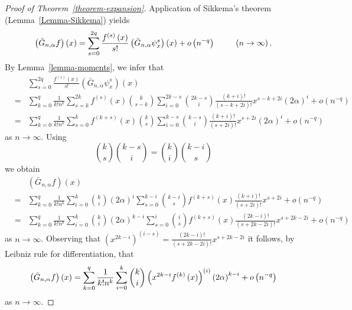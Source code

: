 \documentclass[10pt,a4paper]{amsart}
\begin{document}
\begin{proof}[Proof of Theorem~\protect\ref{theorem-expansion}]
Application of Sikkema's theorem (Lemma~\ref{Lemma-Sikkema}) yields 
\begin{equation*}
\left( \bar{G}_{n,\alpha }f\right) \left( x\right) =\sum_{s=0}^{2q}\frac{%
f^{\left( s\right) }\left( x\right) }{s!}\left( \bar{G}_{n,\alpha }\psi
_{x}^{s}\right) \left( x\right) +o\left( n^{-q}\right) \text{ }\qquad \left(
n\rightarrow \infty \right) .
\end{equation*}%
By Lemma~\ref{lemma-moments}, we infer that 
\begin{eqnarray*}
&&\sum_{s=0}^{2q}\frac{f^{\left( s\right) }\left( x\right) }{s!}\left( \bar{G%
}_{n,\alpha }\psi _{x}^{s}\right) \left( x\right)  \\
&=&\sum_{k=0}^{q}\frac{1}{k!n^{k}}\sum_{s=k}^{2k}f^{\left( s\right) }\left(
x\right) \binom{k}{s-k}\sum_{i=0}^{2k-s}\binom{2k-s}{i}\frac{\left(
k+i\right) !}{\left( s-k+2i\right) !}x^{s-k+2i}\left( 2\alpha \right)
^{i}+o\left( n^{-q}\right)  \\
&=&\sum_{k=0}^{q}\frac{1}{k!n^{k}}\sum_{s=0}^{k}f^{\left( k+s\right) }\left(
x\right) \binom{k}{s}\sum_{i=0}^{k-s}\binom{k-s}{i}\frac{\left( k+i\right) !%
}{\left( s+2i\right) !}x^{s+2i}\left( 2\alpha \right) ^{i}+o\left(
n^{-q}\right) 
\end{eqnarray*}%
as $n\rightarrow \infty $. Using 
\begin{equation*}
\binom{k}{s}\binom{k-s}{i}=\binom{k}{i}\binom{k-i}{s}
\end{equation*}%
we obtain 
\begin{eqnarray*}
&&\left( \bar{G}_{n,\alpha }f\right) \left( x\right)  \\
&=&\sum_{k=0}^{q}\frac{1}{k!n^{k}}\sum_{i=0}^{k}\binom{k}{i}\left( 2\alpha
\right) ^{i}\sum_{s=0}^{k-i}\binom{k-i}{s}f^{\left( k+s\right) }\left(
x\right) \frac{\left( k+i\right) !}{\left( s+2i\right) !}x^{s+2i}+o\left(
n^{-q}\right)  \\
&=&\sum_{k=0}^{q}\frac{1}{k!n^{k}}\sum_{i=0}^{k}\binom{k}{i}\left( 2\alpha
\right) ^{k-i}\sum_{s=0}^{i}\binom{i}{s}f^{\left( k+s\right) }\left(
x\right) \frac{\left( 2k-i\right) !}{\left( s+2k-2i\right) !}%
x^{s+2k-2i}+o\left( n^{-q}\right) 
\end{eqnarray*}%
as $n\rightarrow \infty $. Observing that $\left( x^{2k-i}\right) ^{\left(
i-s\right) }=\frac{\left( 2k-i\right) !}{\left( s+2k-2i\right) !}x^{s+2k-2i}$
it follows, by Leibniz rule for differentiation, that 
\begin{equation*}
\left( \bar{G}_{n,\alpha }f\right) \left( x\right) =\sum_{k=0}^{q}\frac{1}{%
k!n^{k}}\sum_{i=0}^{k}\binom{k}{i}\left( x^{2k-i}f^{\left( k\right) }\left(
x\right) \right) ^{\left( i\right) }\left( 2\alpha \right) ^{k-i}+o\left(
n^{-q}\right) 
\end{equation*}%
as $n\rightarrow \infty $. 
\end{proof}
\end{document}
